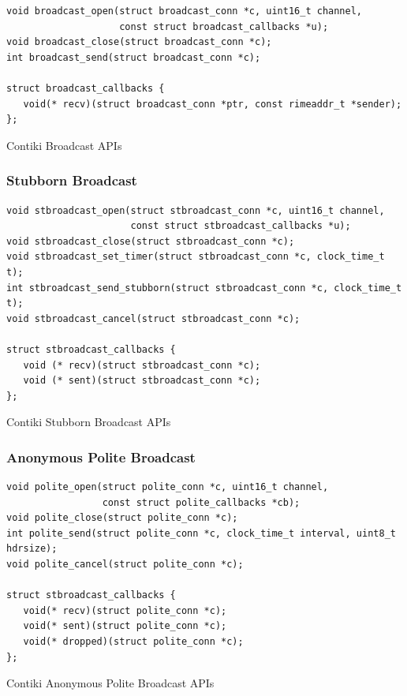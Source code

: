 \begin{listing}[H]
\begin{verbatim}
void broadcast_open(struct broadcast_conn *c, uint16_t channel,
                    const struct broadcast_callbacks *u);
void broadcast_close(struct broadcast_conn *c);
int broadcast_send(struct broadcast_conn *c);

struct broadcast_callbacks {
   void(* recv)(struct broadcast_conn *ptr, const rimeaddr_t *sender);
};
\end{verbatim}
\caption{Contiki Broadcast APIs}
\end{listing}


\subsubsection{Stubborn Broadcast}

\begin{listing}[H]
\begin{verbatim}
void stbroadcast_open(struct stbroadcast_conn *c, uint16_t channel,
                      const struct stbroadcast_callbacks *u);
void stbroadcast_close(struct stbroadcast_conn *c);
void stbroadcast_set_timer(struct stbroadcast_conn *c, clock_time_t t);
int stbroadcast_send_stubborn(struct stbroadcast_conn *c, clock_time_t t);
void stbroadcast_cancel(struct stbroadcast_conn *c);

struct stbroadcast_callbacks {
   void (* recv)(struct stbroadcast_conn *c);
   void (* sent)(struct stbroadcast_conn *c);
};
\end{verbatim}
\caption{Contiki Stubborn Broadcast APIs}
\end{listing}

\subsubsection{Anonymous Polite Broadcast}

\begin{listing}[H]
\begin{verbatim}
void polite_open(struct polite_conn *c, uint16_t channel,
                 const struct polite_callbacks *cb);
void polite_close(struct polite_conn *c);
int polite_send(struct polite_conn *c, clock_time_t interval, uint8_t hdrsize);
void polite_cancel(struct polite_conn *c);

struct stbroadcast_callbacks {
   void(* recv)(struct polite_conn *c);
   void(* sent)(struct polite_conn *c);
   void(* dropped)(struct polite_conn *c);
};
\end{verbatim}
\caption{Contiki Anonymous Polite Broadcast APIs}
\end{listing}


